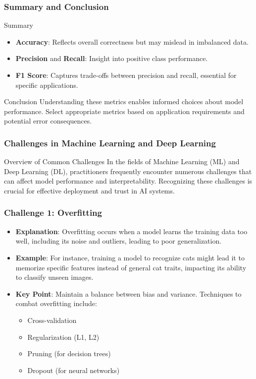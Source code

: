 \documentclass[aspectratio=169]{beamer}
\begin{document}
\begin{frame}[fragile]
    \frametitle{Summary and Conclusion}
    \begin{block}{Summary}
        \begin{itemize}
            \item \textbf{Accuracy}: Reflects overall correctness but may mislead in imbalanced data.
            \item \textbf{Precision} and \textbf{Recall}: Insight into positive class performance.
            \item \textbf{F1 Score}: Captures trade-offs between precision and recall, essential for specific applications.
        \end{itemize}
    \end{block}

    \begin{block}{Conclusion}
        Understanding these metrics enables informed choices about model performance. Select appropriate metrics based on application requirements and potential error consequences.
    \end{block}
\end{frame}

\begin{frame}[fragile]
    \frametitle{Challenges in Machine Learning and Deep Learning}
    \begin{block}{Overview of Common Challenges}
        In the fields of Machine Learning (ML) and Deep Learning (DL), practitioners frequently encounter numerous challenges that can affect model performance and interpretability. Recognizing these challenges is crucial for effective deployment and trust in AI systems.
    \end{block}
\end{frame}

\begin{frame}[fragile]
    \frametitle{Challenge 1: Overfitting}
    \begin{itemize}
        \item \textbf{Explanation}: Overfitting occurs when a model learns the training data too well, including its noise and outliers, leading to poor generalization.
        \item \textbf{Example}: For instance, training a model to recognize cats might lead it to memorize specific features instead of general cat traits, impacting its ability to classify unseen images.
        \item \textbf{Key Point}: Maintain a balance between bias and variance. Techniques to combat overfitting include:
        \begin{itemize}
            \item Cross-validation
            \item Regularization (L1, L2)
            \item Pruning (for decision trees)
            \item Dropout (for neural networks)
        \end{itemize}
    \end{itemize}
\end{frame}
\end{document}

